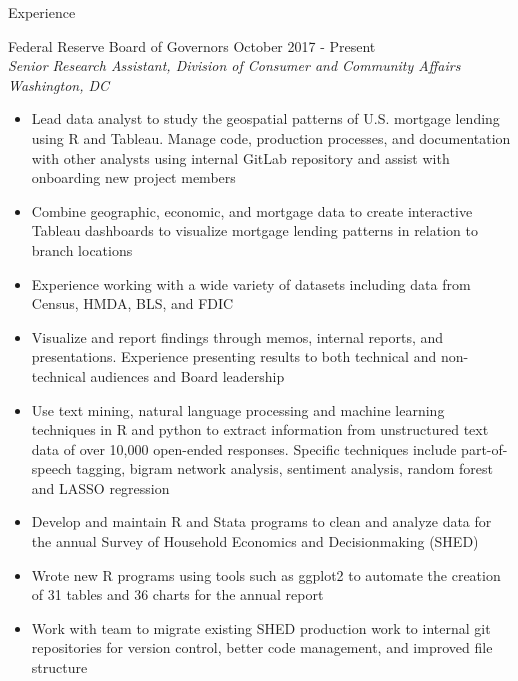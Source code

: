 \documentclass{resume} %
\begin{document}
\begin{rSection}{Experience}

{Federal Reserve Board of Governors} \hfill {October 2017 - Present}\\
{\em Senior Research Assistant, Division of Consumer and Community Affairs} \hfill {\em Washington, DC}
\begin{itemize}[leftmargin=*,  noitemsep, topsep=0pt]
\item Lead data analyst to study the geospatial patterns of U.S. mortgage lending using R and Tableau. Manage code, production processes, and documentation with other analysts using internal GitLab repository and assist with onboarding new project members
\item Combine geographic, economic, and mortgage data to create interactive Tableau dashboards to visualize mortgage lending patterns in relation to branch locations  
\item Experience working with a wide variety of datasets including data from Census, HMDA, BLS, and FDIC
\item Visualize and report findings through memos, internal reports, and presentations. Experience presenting results to both technical and non-technical audiences and Board leadership
\item Use text mining, natural language processing and machine learning techniques in R and python to extract information from unstructured text data of over 10,000 open-ended responses. Specific techniques include part-of-speech tagging, bigram network analysis, sentiment analysis, random forest and LASSO regression
\item Develop and maintain R and Stata programs to clean and analyze data for the annual Survey of Household Economics and Decisionmaking (SHED)
\item Wrote new R programs using tools such as ggplot2 to automate the creation of 31 tables and 36 charts for the annual report
\item Work with team to migrate existing SHED production work to internal git repositories for version control, better code management, and improved file structure


\end{itemize}

\end{rSection}

\end{document}
